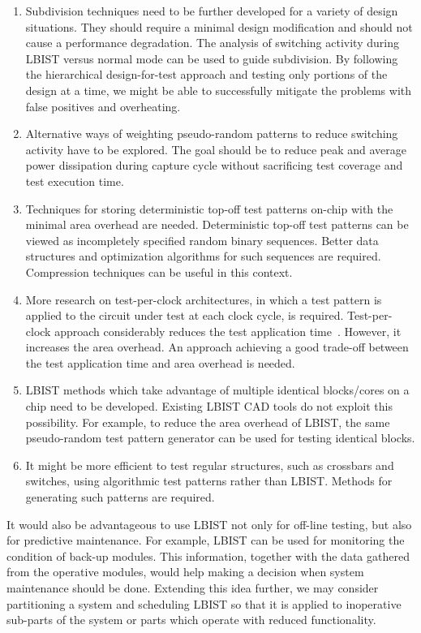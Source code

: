 \documentclass[conference]{IEEEtran}
\begin{document}
\begin{enumerate}
\item Subdivision techniques need to be further developed for a variety of design situations. They should require a minimal design modification and should not cause a performance degradation. 
The analysis of switching activity during LBIST versus normal mode can be used to guide subdivision.
By following the hierarchical design-for-test approach and testing only portions of the design at a time, we
might be able to successfully mitigate the problems with false positives and overheating.

\item Alternative ways of weighting pseudo-random patterns to reduce switching activity 
have to be explored. The goal should be to reduce peak and average power dissipation during capture cycle without sacrificing test coverage and test execution time.

\item Techniques for storing deterministic top-off test patterns on-chip with the minimal area overhead are needed. Deterministic top-off test patterns can be viewed as incompletely specified random binary sequences. Better data structures and optimization algorithms for such sequences are required. Compression techniques can be useful in this context.

\item More research on test-per-clock architectures, in which a test pattern is applied to the circuit under test at each clock cycle, is required. Test-per-clock approach considerably reduces the test application time~\cite{SiSS03}. However, it increases the area overhead. An approach achieving a good trade-off between the test application time and area overhead is needed.

\item LBIST methods which take advantage of multiple identical blocks/cores on a chip need to be developed. Existing LBIST CAD tools do not exploit this possibility.
For example, to reduce the area overhead of LBIST, the same pseudo-random test pattern generator can be used for testing identical blocks.

\item It might be more efficient to test regular structures, such as crossbars and switches, using algorithmic test patterns rather than LBIST. Methods for generating such patterns are required.
\end{enumerate}

It would also be advantageous to use LBIST not only for off-line testing, but also for 
predictive maintenance. For example, LBIST can be used for monitoring the condition of back-up modules. This information, together with the data gathered from the operative modules, would help making a decision when system maintenance should be done.
Extending this idea further, we may consider partitioning a system
and scheduling LBIST so that it is applied to inoperative sub-parts of the system or parts 
which operate with reduced functionality. 
\end{document}
